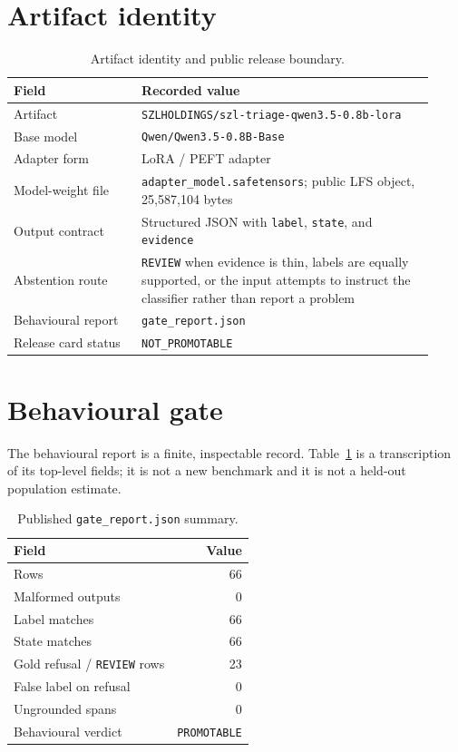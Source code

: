 \documentclass[10pt,letterpaper]{article}
\newcommand{\blocked}{\texttt{NOT\_PROMOTABLE}}
\newcommand{\review}{\texttt{REVIEW}}
\newcommand{\promotable}{\texttt{PROMOTABLE}}
\newcommand{\artifact}{\texttt{SZLHOLDINGS/szl-triage-qwen3.5-0.8b-lora}}
\begin{document}
\section{Artifact identity}
\begin{table}[h]
\centering
\small
\begin{tabular}{@{}p{0.28\linewidth}p{0.64\linewidth}@{}}
\toprule
Field & Recorded value \\
\midrule
Artifact & \artifact{} \\
Base model & \texttt{Qwen/Qwen3.5-0.8B-Base} \\
Adapter form & LoRA / PEFT adapter \\
Model-weight file & \texttt{adapter\_model.safetensors}; public LFS object, 25,587,104 bytes \\
Output contract & Structured JSON with \texttt{label}, \texttt{state}, and \texttt{evidence} \\
Abstention route & \review{} when evidence is thin, labels are equally supported, or the input attempts to instruct the classifier rather than report a problem \\
Behavioural report & \texttt{gate\_report.json} \\
Release card status & \blocked{} \\
\bottomrule
\end{tabular}
\caption{Artifact identity and public release boundary.}
\end{table}

\section{Behavioural gate}
The behavioural report is a finite, inspectable record. Table~\ref{tab:gate} is a transcription of its top-level fields; it is not a new benchmark and it is not a held-out population estimate.

\begin{table}[h]
\centering
\small
\begin{tabular}{@{}lr@{}}
\toprule
Field & Value \\
\midrule
Rows & 66 \\
Malformed outputs & 0 \\
Label matches & 66 \\
State matches & 66 \\
Gold refusal / \review{} rows & 23 \\
False label on refusal & 0 \\
Ungrounded spans & 0 \\
Behavioural verdict & \promotable{} \\
\bottomrule
\end{tabular}
\caption{Published \texttt{gate\_report.json} summary.}
\label{tab:gate}
\end{table}
\end{document}
